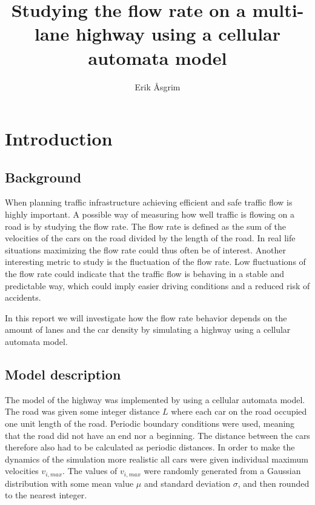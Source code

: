 \documentclass[a4paper,12pt]{article}
\title{Studying the flow rate on a multi-lane highway using a cellular automata model}
\author{Erik Åsgrim}
\begin{document}
\maketitle

\section*{Introduction}
\subsection*{Background}
When planning traffic infrastructure achieving efficient and safe traffic flow is highly important.
A possible way of measuring how well traffic is flowing on a road is by studying the flow rate.
The flow rate is defined as the sum of the velocities of the cars on the road divided by the length of the road.
In real life situations maximizing the flow rate could thus often be of interest. Another interesting metric to study is the fluctuation of the 
flow rate. Low fluctuations of the flow rate could indicate that the traffic flow is behaving in a stable and predictable way, 
which could imply easier driving conditions and a reduced risk of accidents.

In this report we will investigate how the flow rate behavior depends on the amount of lanes and the car density by simulating
a highway using a cellular automata model.

\subsection*{Model description}
The model of the highway was implemented by using a cellular automata model. The road was given some integer distance $L$ where each car on the road occupied one unit length of the road. 
Periodic boundary conditions were used, meaning that the road did not have an end nor a beginning. The distance between the cars therefore also had to be calculated as periodic distances.
In order to make the dynamics of the simulation more realistic all cars were given individual maximum velocities $v_{i,max}$. The values of $v_{i, max}$ were randomly generated 
from a Gaussian distribution with some mean value $\mu$ and standard deviation $\sigma$, and then rounded to the nearest integer.
\end{document}
